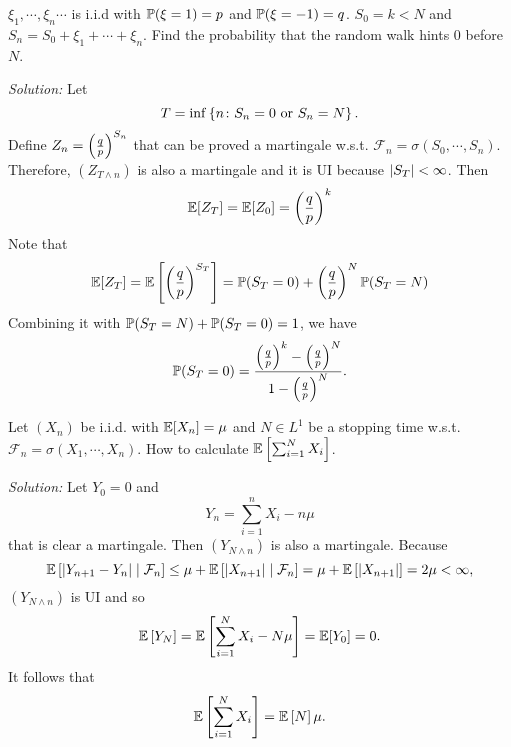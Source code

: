 \begin{exam}
    $\xi_1,\cdots,\xi_n \cdots$ is i.i.d with $\mathbb{P}(\xi = 1) = p$ and $\mathbb{P}(\xi = -1) = q$. $S_0 = k < N$ and $S_n = S_0 + \xi_1 + \cdots +\xi_n$. Find the probability that the random walk hints $0$ before $N$.

    \noindent \emph{Solution:} Let
    \begin{equation*}
        T = \inf \left\{n \colon S_n = 0 \text{ or } S_n = N\right\}.
    \end{equation*}
    Define $Z_n = \left(\frac{q}{p}\right)^{S_n}$ that can be proved a martingale w.s.t. $\mathcal{F}_n = \sigma(S_0,\cdots,S_n)$. Therefore, $(Z_{T \wedge n})$ is also a martingale and it is UI because $\left\lvert S_T\right\lvert < \infty$. Then
    \begin{equation*}
        \mathbb{E}[Z_{T}] = \mathbb{E}[Z_0] = \left(\frac{q}{p}\right)^k
    \end{equation*}
    Note that
    \begin{equation*}
        \mathbb{E}[Z_{T}] = \mathbb{E}\left[\left(\frac{q}{p}\right)^{S_T}\right] = \mathbb{P}(S_T = 0) + \left(\frac{q}{p}\right)^N\mathbb{P}(S_T = N)
    \end{equation*}
    Combining it with $\mathbb{P}(S_T = N) + \mathbb{P}(S_T = 0) = 1$, we have
    \begin{equation*}
        \mathbb{P}(S_T = 0) = \frac{\left(\frac{q}{p}\right)^k-\left(\frac{q}{p}\right)^N}{1-\left(\frac{q}{p}\right)^N}.
    \end{equation*}
\end{exam}

\begin{exam}
    Let $(X_n)$ be i.i.d. with $\mathbb{E}[X_n] = \mu$ and $N \in L^1$ be a stopping time w.s.t. $\mathcal{F}_n = \sigma(X_1,\cdots,X_n)$. How to calculate $\mathbb{E}\left[\sum_{i=1}^NX_i\right]$.

    \noindent \emph{Solution:} Let $Y_0 = 0$ and
    \begin{equation*}
        Y_n = \sum_{i=1}^n X_i- n\mu
    \end{equation*}
    that is clear a martingale. Then $(Y_{N \wedge n})$ is also a martingale. Because
    \begin{equation*}
        \mathbb{E}\left[\left\lvert Y_{n+1}-Y_n\right\lvert \mid \mathcal{F}_n\right] \leq \mu + \mathbb{E}\left[\left\lvert X_{n+1}\right\lvert \mid \mathcal{F}_n\right] = \mu + \mathbb{E}\left[\left\lvert X_{n+1}\right\lvert\right] = 2\mu < \infty,
    \end{equation*}
    $(Y_{N \wedge n})$ is UI and so
    \begin{equation*}
        \mathbb{E}\left[Y_N\right] = \mathbb{E}\left[\sum_{i=1}^{N}X_i - N\mu\right] = \mathbb{E}[Y_0] = 0.
    \end{equation*}
    It follows that
    \begin{equation*}
        \mathbb{E}\left[\sum_{i=1}^{N}X_i\right] = \mathbb{E}\left[N\right]\mu.
    \end{equation*}
\end{exam}

